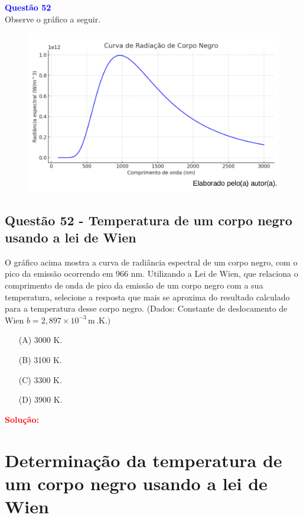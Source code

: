 \begin{flushleft}
\textbf{\textcolor{blue}{\Large Quest\~ao 52}}\\
\noindent
Observe o gráfico a seguir.

\begin{figure}[h]
\centering
\includegraphics[scale=0.5]{figures/radiacaocorponegro.png}
\end{figure}
\subsection{Quest\~ao 52 - Temperatura de um corpo negro usando a lei de Wien}
O gráfico acima mostra a curva de radiância espectral de um
corpo negro, com o pico da emissão ocorrendo em 966 nm.
Utilizando a Lei de Wien, que relaciona o comprimento de
onda de pico da emissão de um corpo negro com a sua
temperatura, selecione a resposta que mais se aproxima do
resultado calculado para a temperatura desse corpo negro.
(Dados: Constante de deslocamento de Wien $b = 2{,}897 \times 10^{-3}\,\mathrm{m}\,.\mathrm{K}.)$

\begin{itemize}
\item[(A)] 3000 K.
\item[(B)] 3100 K.
\item[(C)] 3300 K.
\item[(D)] 3900 K.
\end{itemize}

\vspace{0.5cm}

\textcolor{red}{\textbf{Solução:}}\\

\section*{Determinação da temperatura de um corpo negro usando a lei de Wien}


\end{flushleft}

